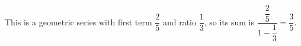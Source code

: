 This is a geometric series with first term $\dfrac{2}{5}$ and ratio $\dfrac{1}{3}$, so its sum is $\dfrac{\dfrac{2}{5}}{1-\dfrac{1}{3}}=\boxed{\dfrac{3}{5}}$.
